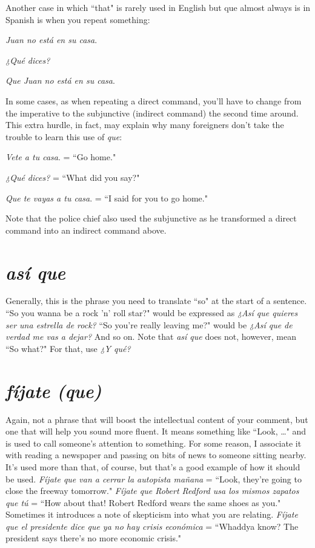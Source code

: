Another case in which ``that" is rarely used in English but que
almost always is in Spanish is when you repeat something:

\bsk

\indu \emph{Juan no está en su casa}.

\indu \emph{¿Qué dices?}

\indu \emph{Que Juan no está en su casa}.

\bsk

In some cases, as when repeating a direct command, you'll have to
change from the imperative to the subjunctive (indirect command) the
second time around. This extra hurdle, in fact, may explain why many
foreigners don't take the trouble to learn this use of \emph{que}:

\bsk

\indu \emph{Vete a tu casa}. = ``Go home."

\indu \emph{¿Qué dices?} = ``What did you say?"

\indu \emph{Que te vayas a tu casa}. = ``I said for you to go home."

\bsk

Note that the police chief also used the subjunctive as he transformed
a direct command into an indirect command above.

\section{\emph{así que}}

Generally, this is the phrase you need to translate ``so" at the
start of a sentence. ``So you wanna be a rock 'n' roll star?" would be
expressed as \emph{¿Así que quieres ser una estrella de rock?} ``So you're
really leaving me?" would be \emph{¿Así que de verdad me vas a dejar?} And
so on. Note that \emph{así que} does not, however, mean ``So what?" For that,
use \emph{¿Y qué?}

\section{\emph{fíjate (que)}}

Again, not a phrase that will boost the intellectual content of
your comment, but one that will help you sound more fluent. It means
something like ``Look, \ldots{}" and is used to call someone's attention to
something. For some reason, I associate it with reading a newspaper
and passing on bits of news to someone sitting nearby. It's used more
than that, of course, but that's a good example of how it should be
used. \emph{Fíjate que van a cerrar la autopista mañana} = ``Look, they're
going to close the freeway tomorrow." \emph{Fíjate que Robert Redford usa
los mismos zapatos que tú} = ``How about that! Robert Redford wears
the same shoes as you." Sometimes it introduces a note of skepticism
into what you are relating. \emph{Fíjate que el presidente dice que ya no hay
crisis económica} = ``Whaddya know? The president says there's no
more economic crisis."

